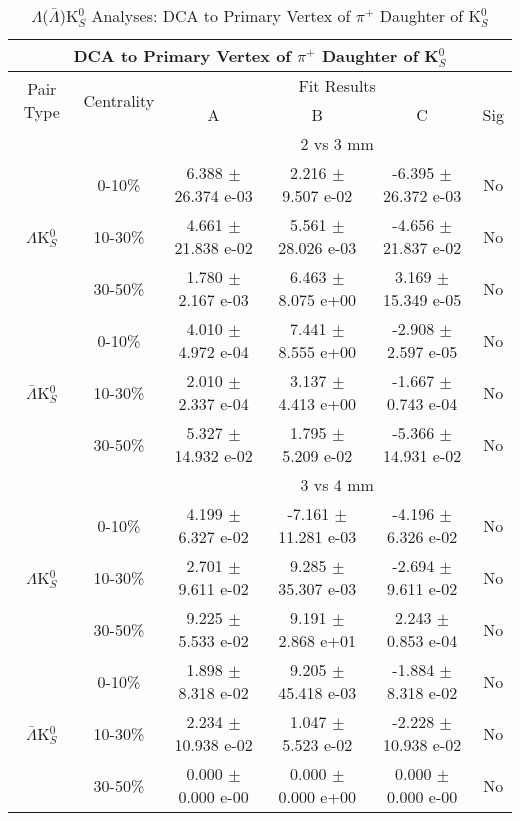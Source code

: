 \documentclass[../AnalysisNoteJBuxton.tex]{subfiles}
\begin{document}
\begin{table}
 \centering
 \begin{tabular}{|c|c|c|c|c|c|}
  \multicolumn{6}{c}{DCA to Primary Vertex of $\pi^{+}$ Daughter of K$^{0}_{S}$} \\
  \hline
  \multirow{2}{*}{Pair Type} & \multirow{2}{*}{Centrality} & \multicolumn{4}{c|}{Fit Results} \\
  \cline{3-6}
   & & A & B & C & Sig \\  
  \hline
  \multicolumn{2}{|c}{} & \multicolumn{4}{c|}{2 vs 3 mm} \\  
  \hline  
  \multirow{3}{*}{$\Lambda$K$^{0}_{S}$}
   &  0-10\% & 6.388 $\pm$ 26.374 e-03 & 2.216 $\pm$ 9.507 e-02 & -6.395 $\pm$ 26.372 e-03 & No \\
   & 10-30\% & 4.661 $\pm$ 21.838 e-02 & 5.561 $\pm$ 28.026 e-03 & -4.656 $\pm$ 21.837 e-02 & No \\
   & 30-50\% & 1.780 $\pm$ 2.167 e-03 & 6.463 $\pm$ 8.075 e+00 & 3.169 $\pm$ 15.349 e-05 & No \\
  \hline
  \multirow{3}{*}{$\bar{\Lambda}$K$^{0}_{S}$}  
   &  0-10\% & 4.010 $\pm$ 4.972 e-04 & 7.441 $\pm$ 8.555 e+00 & -2.908 $\pm$ 2.597 e-05 & No \\
   & 10-30\% & 2.010 $\pm$ 2.337 e-04 & 3.137 $\pm$ 4.413 e+00 & -1.667 $\pm$ 0.743 e-04 & No \\
   & 30-50\% & 5.327 $\pm$ 14.932 e-02 & 1.795 $\pm$ 5.209 e-02 & -5.366 $\pm$ 14.931 e-02 & No \\
  \hline 
  \multicolumn{2}{|c}{} & \multicolumn{4}{c|}{3 vs 4 mm} \\
  \hline  
  \multirow{3}{*}{$\Lambda$K$^{0}_{S}$}   
   &  0-10\% & 4.199 $\pm$ 6.327 e-02 & -7.161 $\pm$ 11.281 e-03 & -4.196 $\pm$ 6.326 e-02 & No \\
   & 10-30\% & 2.701 $\pm$ 9.611 e-02 & 9.285 $\pm$ 35.307 e-03 & -2.694 $\pm$ 9.611 e-02 & No \\
   & 30-50\% & 9.225 $\pm$ 5.533 e-02 & 9.191 $\pm$ 2.868 e+01 & 2.243 $\pm$ 0.853 e-04 & No \\
  \hline  
  \multirow{3}{*}{$\bar{\Lambda}$K$^{0}_{S}$}
   &  0-10\% & 1.898 $\pm$ 8.318 e-02 & 9.205 $\pm$ 45.418 e-03 & -1.884 $\pm$ 8.318 e-02 & No \\
   & 10-30\% & 2.234 $\pm$ 10.938 e-02 & 1.047 $\pm$ 5.523 e-02 & -2.228 $\pm$ 10.938 e-02 & No \\
   & 30-50\% & 0.000 $\pm$ 0.000 e-00 & 0.000 $\pm$ 0.000 e+00 & 0.000 $\pm$ 0.000 e-00 & No \\
  \hline
 \end{tabular}
 \caption{$\Lambda$($\bar{\Lambda}$)K$^{0}_{S}$ Analyses: DCA to Primary Vertex of $\pi^{+}$ Daughter of K$^{0}_{S}$}
 \label{tab:DcaToPrimVertexPosPionDaughtOfK0LamK0Full}
\end{table}
\end{document}
